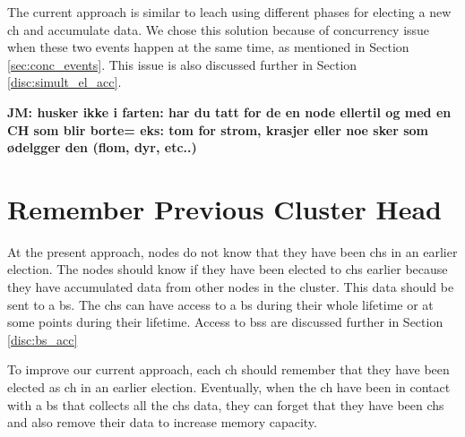 \documentclass[USenglish]{uit-thesis}
\begin{document}

The current approach is similar to \gls{leach} using different phases for electing a new \gls{ch} and accumulate data. We chose this solution because of concurrency issue when these two events happen at the same time, as mentioned in Section \ref{sec:conc_events}. This issue is also discussed further in Section \ref{disc:simult_el_acc}.

\textbf{JM: husker ikke i farten: har du tatt for de en node ellertil og med en CH som blir borte= eks: tom for strom, krasjer eller noe sker som ødelgger den (flom, dyr, etc..)}



\section{Remember Previous Cluster Head}
At the present approach, nodes do not know that they have been \glspl{ch} in an earlier election. The nodes should know if they have been elected to \glspl{ch} earlier because they have accumulated data from other nodes in the cluster. This data should be sent to a \gls{bs}. The \glspl{ch} can have access to a \gls{bs} during their whole lifetime or at some points during their lifetime. Access to \glspl{bs} are discussed further in Section \ref{disc:bs_acc}

To improve our current approach, each \gls{ch} should remember that they have been elected as \gls{ch} in an earlier election. Eventually, when the \gls{ch} have been in contact with a \gls{bs} that collects all the \glspl{ch} data, they can forget that they have been \glspl{ch} and also remove their data to increase memory capacity.


\end{document}
